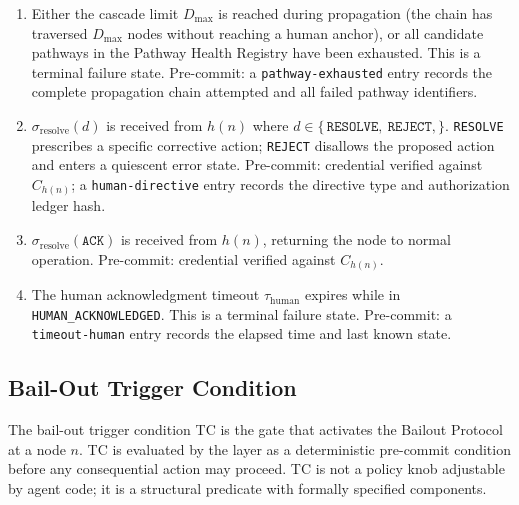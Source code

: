 \begin{enumerate}
\item[$\textbf{T7 (ESCALATING} \rightarrow \textbf{PATHWAY\_EXHAUSTED):}$] Either the cascade limit $D_{\max}$ is reached during propagation (the chain has traversed $D_{\max}$ nodes without reaching a human anchor), or all candidate pathways in the Pathway Health Registry have been exhausted. This is a terminal failure state. Pre-commit: a \texttt{pathway-exhausted} entry records the complete propagation chain attempted and all failed pathway identifiers.

\item[$\textbf{T8 (HUMAN\_ACKNOWLEDGED} \rightarrow \textbf{RESOLVED):}$] $\sigma_{\text{resolve}}(d)$ is received from $h(n)$ where $d \in \{\,\texttt{RESOLVE},\ \texttt{REJECT},\}$. \texttt{RESOLVE} prescribes a specific corrective action; \texttt{REJECT} disallows the proposed action and enters a quiescent error state. Pre-commit: credential verified against $C_{h(n)}$; a \texttt{human-directive} entry records the directive type and authorization ledger hash.

\item[$\textbf{T9 (HUMAN\_ACKNOWLEDGED} \rightarrow \textbf{IDLE):}$] $\sigma_{\text{resolve}}(\texttt{ACK})$ is received from $h(n)$, returning the node to normal operation. Pre-commit: credential verified against $C_{h(n)}$.

\item[$\textbf{T10 (HUMAN\_ACKNOWLEDGED} \rightarrow \textbf{TIMEOUT):}$] The human acknowledgment timeout $\tau_{\text{human}}$ expires while in \texttt{HUMAN\_ACKNOWLEDGED}. This is a terminal failure state. Pre-commit: a \texttt{timeout-human} entry records the elapsed time and last known state.
\end{enumerate}

\subsection{Bail-Out Trigger Condition}
\label{sec:bp-trigger}

The bail-out trigger condition TC is the gate that activates the Bailout Protocol at a node $n$. TC is evaluated by the \fact{} layer as a deterministic pre-commit condition before any consequential action may proceed. TC is not a policy knob adjustable by agent code; it is a structural predicate with formally specified components.

